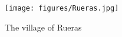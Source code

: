 
 \begin{figure}
	\texttt{[image: figures/Rueras.jpg]}
	\caption{The village of Rueras}
\end{figure}



